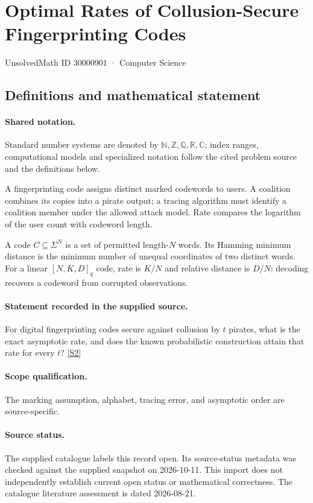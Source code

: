 \documentclass[11pt]{article}
\newcommand{\sref}[2]{\hyperlink{source:#1:#2}{[S#2]}}
\begin{document}
\setcounter{section}{30000900}
\section{Optimal Rates of Collusion-Secure Fingerprinting Codes}\label{30000901}
{\small\sffamily UnsolvedMath ID 30000901 · Computer Science}
\subsection{Definitions and mathematical statement}

\paragraph{Shared notation.}Standard number systems are denoted by $\mathbb N,\mathbb Z,\mathbb Q,\mathbb R,\mathbb C$; index ranges, computational models and specialized notation follow the cited problem source and the definitions below.


A fingerprinting code assigns distinct marked codewords to users. A coalition combines its copies into a pirate output; a tracing algorithm must identify a coalition member under the allowed attack model. Rate compares the logarithm of the user count with codeword length.

A code $C\subseteq\Sigma^N$ is a set of permitted length-$N$ words. Its Hamming minimum distance is the minimum number of unequal coordinates of two distinct words. For a linear $[N,K,D]_q$ code, rate is $K/N$ and relative distance is $D/N$; decoding recovers a codeword from corrupted observations.
\paragraph{Statement recorded in the supplied source.}
For digital fingerprinting codes secure against collusion by $t$ pirates, what is the exact asymptotic rate, and does the known probabilistic construction attain that rate for every $t$? \sref{30000901}{2}
\paragraph{Scope qualification.}
The marking assumption, alphabet, tracing error, and asymptotic order are source-specific.
\paragraph{Source status.}
The supplied catalogue labels this record open. Its source-status metadata was checked against the supplied snapshot on 2026-10-11. This import does not independently establish current open status or mathematical correctness. The catalogue literature assessment is dated 2026-08-21.
\end{document}
